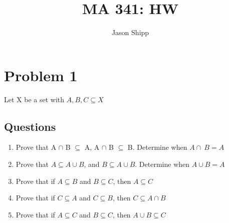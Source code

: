 \documentclass{article}
\begin{document}
\title{MA 341: HW}
\author{Jason Shipp} 
\maketitle
\section*{Problem 1}
Let X be a set with \(A, B, C \subseteq X\)
\subsection*{Questions}
\begin{enumerate}[label=\alph*]
\item Prove that A \(\cap\) B \(\subseteq\) A, A \(\cap\) B \(\subseteq\) B. Determine when \(A \cap\ B = A\)
\item Prove that \(A \subseteq A \cup B\), and \(B \subseteq A \cup B\). Determine when \(A \cup B = A\)
\item Prove that if \(A \subseteq B\) and \(B \subseteq C\), then \(A \subseteq C\)
\item Prove that if \(C \subseteq A\) and \(C \subseteq B\), then \(C \subseteq A \cap B\)
\item Prove that if \(A \subseteq C\) and \(B \subseteq C\), then \(A \cup B \subseteq C\)
\end{enumerate}
\end{document}
